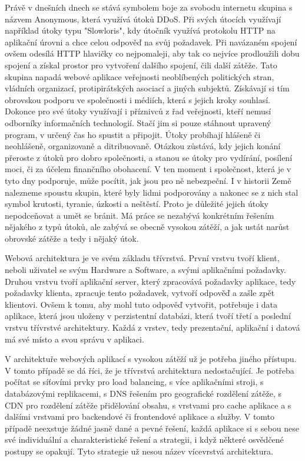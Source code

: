 \documentclass[12pt]{article}
\begin{document}
Právě v dnešních dnech se stává symbolem boje za svobodu internetu skupina s názvem Anonymous, která využívá útoků DDoS. Při svých útocích využívají například útoky typu "Slowloris", kdy útočník využívá protokolu HTTP na aplikační úrovni a chce celou odpověď na svůj požadavek. Při navázaném spojení ovšem odesílá HTTP hlavičky co nejpomaleji, aby tak co nejvíce prodloužili dobu spojení a získal prostor pro vytvoření dalšího spojení, čili další zátěže. Tato skupina napadá webové aplikace veřejnosti neoblíbených politických stran, vládních organizací, protipirátských asociací a jiných subjektů. Získávají si tím obrovskou podporu ve společnosti i médiích, která s jejich kroky souhlasí. Dokonce pro své útoky využívají i příznivců z řad veřejnosti, kteří nemusí odborníky informačních technologií. Stačí jim si pouze stáhnout upravený program, v určený čas ho spustit a připojit. Útoky probíhají hlášeně či neohlášeně, organizovaně a ditribuovaně. Otázkou zůstává, kdy jejich konání přeroste z útoků pro dobro společnosti, a stanou se útoky pro vydírání, posílení moci, či za účelem finančního obohacení. V ten moment i společnost, která je v tyto dny podporuje, může pocítit, jak jsou pro ně nebezpeční. I v historii Země nalezneme spoustu skupin, které byly lidmi podporovány a nakonec se z nich stal symbol krutosti, tyranie, úzkosti a neštěstí. Proto je důležité jejich útoky nepodceňovat a umět se bránit. Má práce se nezabývá konkrétním řešením nějakého z typů útoků, ale zabývá se obecně vysokou zátěží, a jak ustát narůst obrovské zátěže a tedy i nějaký útok.\cite{anonymous}



Webová architektura je ve svém základu třívrstvá. První vrstvu tvoří klient, neboli uživatel se svým Hardware a Software, a svými aplikačními požadavky. Druhou vrstvu tvoří aplikační server, který zpracovává požadavky aplikace, tedy požadavky klienta, zpracuje tento požadavek, vytvoří odpověď a zašle zpět klientovi. Ovšem k tomu, aby mohl tuto odpověď vytvořit, potřebuje i data aplikace, která jsou uloženy v perzistentní databázi, která tvoří třetí a poslední vrstvu třívrstvé architektury. Každá z vrstev, tedy prezentační, aplikační i datová má své místo a svou správu v aplikaci.\cite{tri-vrstvy}

\obrazek
{}

V architektuře webových aplikací s vysokou zátěží už je potřeba jiného přístupu. V tomto případě se dá říci, že je třívrstvá architektura nedostačující. Je potřeba počítat se síťovími prvky pro load balancing, s více aplikačními stroji, s databázovými replikacemi, s DNS řešením pro geografické rozdělení zátěže, s CDN pro rozdělení zátěže přidělování obsahu, s vrstvami pro cache aplikace a s dalšími vrstvami pro backendové či frontendové aplikace a služby. V tomto případě neexstuje žádné jasně dané a pevné řešení, každá aplikace si s sebou nese své individuální a charakteristické řešení a strategii, i když některé osvědčené postupy se opakují. Tyto strategie už nesou název vícevrstvá architektura.
\end{document}
